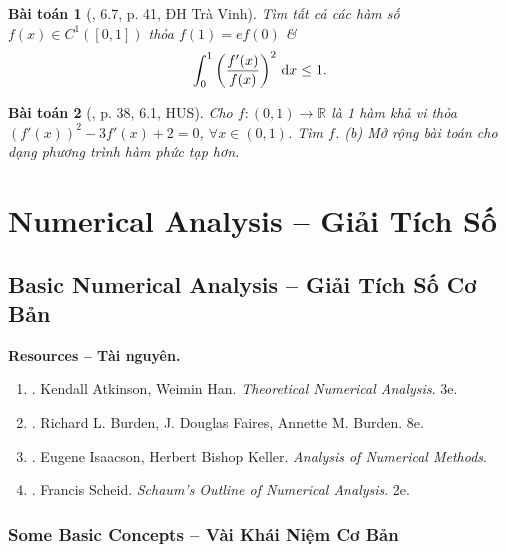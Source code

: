 \documentclass[oneside]{book}
\newtheorem{baitoan}{Bài toán}
\begin{document}
\begin{baitoan}[\cite{VMS_VMC2023}, 6.7, p. 41, ĐH Trà Vinh]
	Tìm tất cả các hàm số $f(x)\in C^1([0,1])$ thỏa $f(1) = ef(0)$ \&
	\begin{equation*}
		\int_0^1 \left(\frac{f'(x)}{f(x)}\right)^2\,{\rm d}x\le1.
	\end{equation*}
\end{baitoan}

\begin{baitoan}[\cite{VMS_VMC2024}, p. 38, 6.1, HUS]
	Cho $f:(0,1)\to\mathbb{R}$ là 1 hàm khả vi thỏa $(f'(x))^2 - 3f'(x) + 2 = 0$, $\forall x\in(0,1)$. Tìm $f$. (b) Mở rộng bài toán cho dạng phương trình hàm phức tạp hơn.
\end{baitoan}


\part{Numerical Analysis -- Giải Tích Số}


\chapter{Basic Numerical Analysis -- Giải Tích Số Cơ Bản}
\minitoc
\textbf{\textsf{Resources -- Tài nguyên.}}
\begin{enumerate}
	\item \cite{Atkinson_Han2009}. {\sc Kendall Atkinson, Weimin Han}. {\it Theoretical Numerical Analysis}. 3e.
	
	\item \cite{Burden_Faires_Burden2015}. {\sc Richard L. Burden, J. Douglas Faires, Annette M. Burden}. 8e.
	
	\item \cite{Isaacson_Keller1994}. {\sc Eugene Isaacson, Herbert Bishop Keller}. {\it Analysis of Numerical Methods}.
	
	\item \cite{Scheid1989}. {\sc Francis Scheid}. {\it Schaum's Outline of Numerical Analysis}. 2e.
\end{enumerate}


\section{Some Basic Concepts -- Vài Khái Niệm Cơ Bản}
\end{document}
